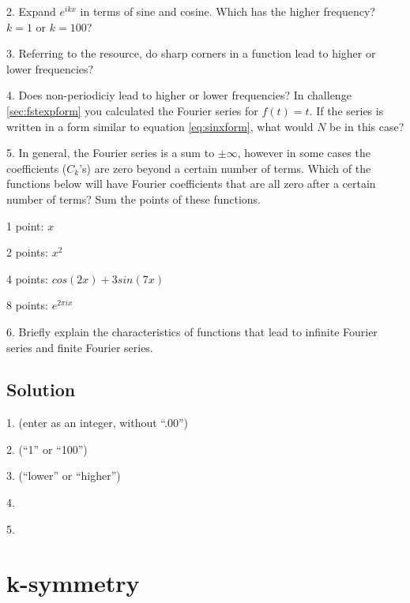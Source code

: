 \vspace{1em}
2. Expand $e^{i k x}$ in terms of sine and cosine. Which has the higher frequency? $k=1$ or $k=100$?

\vspace{1em}
3. Referring to the resource, do sharp corners in a function lead to higher or lower frequencies? %

\vspace{1em}
4. Does non-periodiciy lead to higher or lower frequencies? In challenge \ref{sec:fstexpform} you calculated the Fourier series for $f(t)=t$. If the series is written in a form similar to equation \ref{eq:sinxform}, what would $N$ be in this case? %

\vspace{1em}
5. In general, the Fourier series is a sum to $\pm \infty$, however in some cases the coefficients ($C_k$'s) are zero beyond a certain number of terms. Which of the functions below will have Fourier coefficients that are all zero after a certain number of terms? Sum the points of these functions.

1 point: $x$

2 points: $x^2$

4 points: $cos(2 x) + 3 sin(7 x)$

8 points: $e^{2 \pi i x}$

\vspace{1em}
6. Briefly explain the characteristics of functions that lead to infinite Fourier series and finite Fourier series.

\subsection*{Solution}
1. (enter as an integer, without ``.00'')  

2. (``1'' or ``100'') 

3. (``lower'' or ``higher'') 

4. 

5. 




\newpage
\section{k-symmetry}

